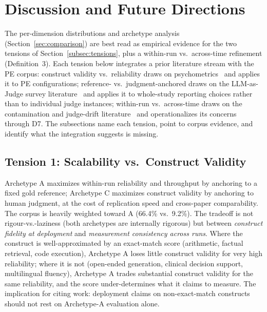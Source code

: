 \documentclass[acmsmall, nonacm, screen]{acmart}
\begin{document}
\section{Discussion and Future Directions}
\label{sec:discussion}

The per-dimension distributions and archetype analysis
(Section~\ref{sec:comparison}) are best read as empirical evidence
for the two tensions of Section~\ref{subsec:tensions}, plus a
within-run vs.\ across-time refinement (Definition~3). Each tension
below integrates a prior literature stream with the PE corpus:
construct validity vs.\ reliability draws on
psychometrics~\cite{cronbach1955construct, messick1995validity,
jacobs2021measurement, ye2025psychometrics} and applies it to PE
configurations; reference- vs.\ judgment-anchored draws on the
LLM-as-Judge survey literature~\cite{gu2025llmjudge,
li2025generationjudgment} and applies it to whole-study reporting
choices rather than to individual judge instances; within-run vs.\
across-time draws on the contamination and judge-drift
literature~\cite{balloccu2024leakcheat, feng2025sage,
bellibatlu2026judgesense} and operationalizes its concerns through
D7. The subsections name each tension, point to corpus evidence,
and identify what the integration suggests is missing.

\subsection{Tension 1: Scalability vs.\ Construct Validity}
\label{subsec:tension_scalability}

Archetype A maximizes within-run reliability and throughput by
anchoring to a fixed gold reference; Archetype C maximizes construct
validity by anchoring to human judgment, at the cost of replication
speed and cross-paper comparability. The corpus is heavily weighted
toward A (66.4\% vs.\ 9.2\%). The tradeoff is not rigour-vs.-laziness
(both archetypes are internally rigorous) but between \emph{construct
fidelity at deployment} and \emph{measurement consistency across
runs}. Where the construct is well-approximated by an exact-match
score (arithmetic, factual retrieval, code execution), Archetype A
loses little construct validity for very high reliability; where it
is not (open-ended generation, clinical decision support, multilingual
fluency), Archetype A trades substantial construct validity for the
same reliability, and the score under-determines what it claims to
measure. The implication for citing work: deployment claims on
non-exact-match constructs should not rest on Archetype-A evaluation
alone.
\end{document}
